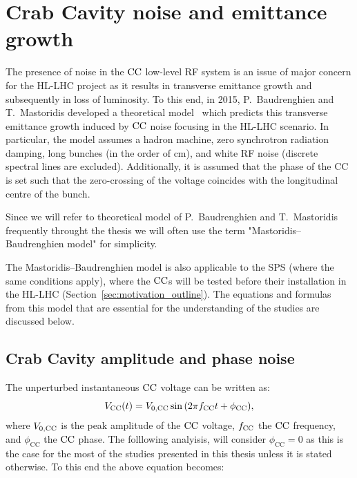

\section{Crab Cavity noise and emittance growth}\label{sec:CC_noise_intro}
The presence of noise in the ${\mathrm{CC}}$ low-level RF system is an issue of major concern for the HL-LHC project as it results in transverse emittance growth and subsequently in loss of luminosity. To this end, in 2015, P.~Baudrenghien and T.~Mastoridis developed a theoretical model~\cite{PhysRevSTAB.18.101001} which predicts this transverse emittance growth induced by ${\mathrm{CC}}$ noise focusing in the HL-LHC scenario. In particular, the model assumes a hadron machine, zero synchrotron radiation damping, long bunches (in the order of cm), and white RF noise (discrete spectral lines are excluded). Additionally, it is assumed that the phase of the CC is set such that the zero-crossing of the voltage coincides with the longitudinal centre of the bunch.

Since we will refer to theoretical model of P.~Baudrenghien and T.~Mastoridis ~\cite{PhysRevSTAB.18.101001} frequently throught the thesis we will often use the term "Mastoridis--Baudrenghien model" for simplicity.

The Mastoridis--Baudrenghien model is also applicable to the SPS (where the same conditions apply), where the ${\mathrm{CC}}$s will be tested before their installation in the HL-LHC (Section~\ref{sec:motivation_outline}). The equations and formulas from this model that are essential for the understanding of the studies are discussed below.




\subsection{Crab Cavity amplitude and phase noise}\label{subsec:AN_PN}
The unperturbed instantaneous ${\mathrm{CC}}$ voltage can be written as:
\begin{equation}\label{eq:CC_voltage_t_phase}
    V_\mathrm{CC}(t) = {V_\mathrm{0, CC}} \sin{\left ( 2 \pi {f_\mathrm{CC}}t + \phi_\mathrm{CC} \right )},
\end{equation}
where ${V_\mathrm{0, CC}}$ is the peak amplitude of the ${\mathrm{CC}}$ voltage, ${f_\mathrm{CC}}$ the ${\mathrm{CC}}$ frequency, and $\phi_\mathrm{CC}$ the ${\mathrm{CC}}$ phase. The folllowing analyisis, will consider $\phi_\mathrm{CC}=0$ as this is the case for the most of the studies presented in this thesis unless it is stated otherwise. To this end the above equation becomes: 

